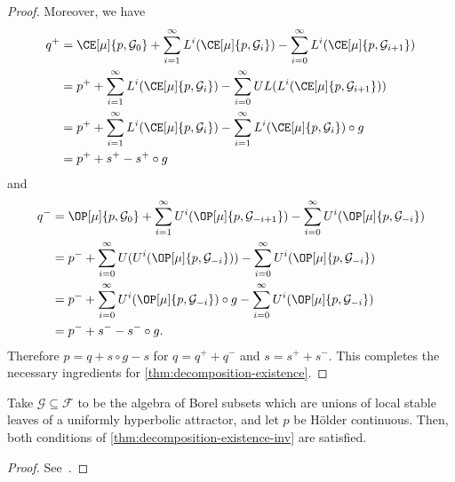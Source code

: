 \documentclass[../main]{subfiles}
\begin{document}
\begin{proof}
  Moreover, we have
  \begin{align*}
    q^+ &=
        \CE[\mu]{p,\mathcal{G}_0} + 
        \sum_{i = 1}^{\infty} L^i(\CE[\mu]{p,\mathcal{G}_i}) - 
        \sum_{i = 0}^{\infty} L^i(\CE[\mu]{p, \mathcal{G}_{i + 1}})\\
      &=
        p^+ +
        \sum_{i = 1}^{\infty} L^i(\CE[\mu]{p,\mathcal{G}_i}) - 
        \sum_{i = 0}^{\infty} UL(L^i(\CE[\mu]{p, \mathcal{G}_{i + 1}}))\\
      &=
        p^+ +
        \sum_{i = 1}^{\infty} L^i(\CE[\mu]{p,\mathcal{G}_i}) - 
        \sum_{i = 1}^{\infty} L^i(\CE[\mu]{p, \mathcal{G}_{i}}) \circ g\\
      &=
        p^+ + s^+ - s^+ \circ g
  \end{align*}
  and
  \begin{align*}
    q^- &=
        \OP[\mu]{p,\mathcal{G}_0} + 
        \sum_{i = 1}^{\infty} U^i(\OP[\mu]{p,\mathcal{G}_{-i + 1}}) - 
        \sum_{i = 0}^{\infty} U^i(\OP[\mu]{p, \mathcal{G}_{-i}})\\
      &=
        p^- +
        \sum_{i = 0}^{\infty} U(U^i(\OP[\mu]{p,\mathcal{G}_{-i}})) - 
        \sum_{i = 0}^{\infty} U^i(\OP[\mu]{p, \mathcal{G}_{-i}})\\
      &=
        p^- +
        \sum_{i = 0}^{\infty} U^i(\OP[\mu]{p,\mathcal{G}_{-i}}) \circ g - 
        \sum_{i = 0}^{\infty} U^i(\OP[\mu]{p, \mathcal{G}_{-i}})\\
      &=
        p^- + s^- - s^- \circ g.
  \end{align*}
  Therefore \(p = q + s \circ g - s\) for \(q = q^+ + q^-\) and \(s = s^+ + s^-\). This completes the necessary ingredients for \cref{thm:decomposition-existence}.
\end{proof}

\begin{lemma}
  Take \(\mathcal{G} \subseteq \mathcal{F}\) to be the algebra of Borel subsets which are unions of local stable leaves of a uniformly hyperbolic attractor, and let \(p\) be Hölder continuous. Then, both conditions of \cref{thm:decomposition-existence-inv} are satisfied.
\end{lemma}

\begin{proof}
  See~\textcite[Proposition 4.14]{vianaStochasticDynamicsDeterministic1997}.
\end{proof}

\end{document}
